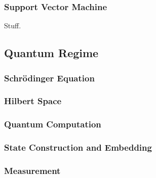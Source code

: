\subsubsection{Support Vector Machine}
Stuff. 

\subsection{Quantum Regime}

\subsubsection{Schr\"odinger Equation}

\subsubsection{Hilbert Space}

\subsubsection{Quantum Computation}

\subsubsection{State Construction and Embedding}

\subsubsection{Measurement}